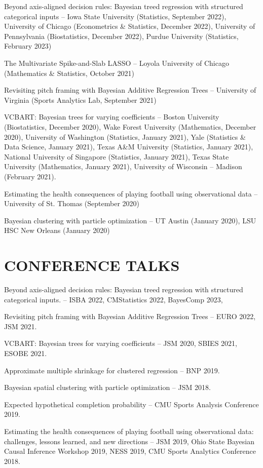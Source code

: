 \documentclass[margin]{res}
\begin{document}
\begin{resume}
Beyond axis-aligned decision rules: Bayesian treed regression with structured categorical inputs -- Iowa State University (Statistics, September 2022), University of Chicago (Econometrics \& Statistics, December 2022), University of Pennsylvania (Biostatistics, December 2022), Purdue University (Statistics, February 2023)

The Multivariate Spike-and-Slab LASSO -- Loyola University of Chicago (Mathematics \& Statistics, October 2021)

Revisiting pitch framing with Bayesian Additive Regression Trees -- University of Virginia (Sports Analytics Lab, September 2021)

VCBART: Bayesian trees for varying coefficients -- Boston University (Biostatistics, December 2020), Wake Forest University (Mathematics, December 2020), University of Washington (Statistics, January 2021), 
Yale (Statistics \& Data Science, January 2021), Texas A\&M University (Statistics, January 2021), National University of Singapore (Statistics, January 2021), Texas State University (Mathematics, January 2021), University of Wisconsin -- Madison (February 2021). 

Estimating the health consequences of playing football using observational data -- University of St. Thomas (September 2020)

Bayesian clustering with particle optimization -- UT Austin (January 2020), LSU HSC New Orleans (January 2020)

\section{CONFERENCE \hspace{0.1in} TALKS}

Beyond axis-aligned decision rules: Bayesian treed regression with structured categorical inputs. -- ISBA 2022, CMStatistics 2022, BayesComp 2023,

Revisiting pitch framing with Bayesian Additive Regression Trees -- EURO 2022, JSM 2021.

VCBART: Bayesian trees for varying coefficients -- JSM 2020, SBIES 2021, ESOBE 2021.

Approximate multiple shrinkage for clustered regression -- BNP 2019.

Bayesian spatial clustering with particle optimization -- JSM 2018. 

Expected hypothetical completion probability -- CMU Sports Analysis Conference 2019.

Estimating the health consequences of playing football using observational data: challenges, lessons learned, and new directions -- JSM 2019, Ohio State Bayesian Causal Inference Workshop 2019, NESS 2019, CMU Sports Analytics Conference 2018.


\end{resume}
\end{document}
